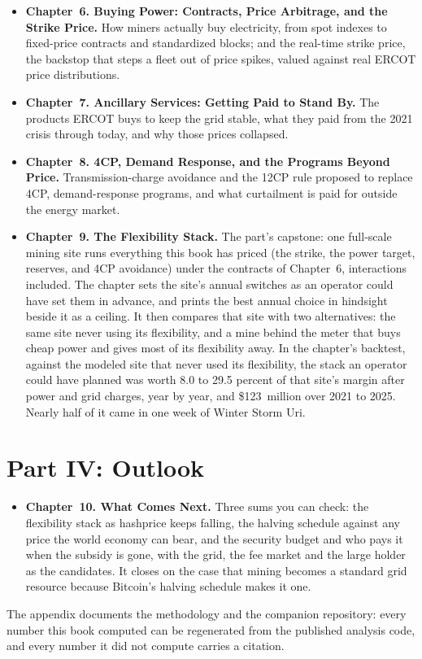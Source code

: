 \begin{itemize}
\item \textbf{Chapter~6. Buying Power: Contracts, Price Arbitrage, and
the Strike Price.} How miners actually buy electricity, from spot
indexes to fixed-price contracts and standardized blocks; and the
real-time strike price, the backstop that steps a fleet out of price
spikes, valued against real ERCOT price distributions.

\item \textbf{Chapter~7. Ancillary Services: Getting Paid to Stand By.}
The products ERCOT buys to keep the grid stable, what they paid from
the 2021 crisis through today, and why those prices collapsed.

\item \textbf{Chapter~8. 4CP, Demand Response, and the Programs Beyond
Price.} Transmission-charge avoidance and the 12CP rule proposed to
replace 4CP, demand-response programs, and what curtailment is paid for
outside the energy market.

\item \textbf{Chapter~9. The Flexibility Stack.}
The part's capstone: one full-scale mining site runs everything this
book has priced (the strike, the power target, reserves, and 4CP
avoidance) under the contracts of Chapter~6, interactions included. The
chapter sets the site's annual switches as an operator could have set
them in advance, and prints the best annual choice in hindsight beside
it as a ceiling. It then compares that site with two alternatives: the same
site never using its flexibility, and a mine behind the meter that buys
cheap power and gives most of its flexibility away. In the chapter's backtest, against the modeled site
that never used its flexibility, the stack an operator could have
planned was worth 8.0 to 29.5 percent of that site's margin after
power and grid charges, year by
year, and \$123~million over 2021 to 2025. Nearly half of it came in
one week of Winter Storm Uri.
\end{itemize}

\section*{Part IV: Outlook}

\begin{itemize}
\item \textbf{Chapter~10. What Comes Next.} Three sums you can
check: the flexibility stack as hashprice keeps falling, the halving
schedule against any price the world economy can bear, and the security
budget and who pays it when the subsidy is gone, with the grid, the fee
market and the large holder as the candidates. It closes on the case that mining
becomes a standard grid resource because Bitcoin's halving schedule makes it one.
\end{itemize}

The appendix documents the methodology and the companion repository: every
number this book computed can be regenerated from the published analysis
code, and every number it did not compute carries a citation.
